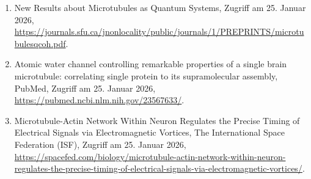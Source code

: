 \documentclass[11pt,a4paper]{article}
\begin{document}
\begin{enumerate}
\item New Results about Microtubules as Quantum Systems, Zugriff am 25. Januar 2026, \url{https://journals.sfu.ca/jnonlocality/public/journals/1/PREPRINTS/microtubulesqcoh.pdf}.
\item Atomic water channel controlling remarkable properties of a single brain microtubule: correlating single protein to its supramolecular assembly, PubMed, Zugriff am 25. Januar 2026, \url{https://pubmed.ncbi.nlm.nih.gov/23567633/}.
\item Microtubule-Actin Network Within Neuron Regulates the Precise Timing of Electrical Signals via Electromagnetic Vortices, The International Space Federation (ISF), Zugriff am 25. Januar 2026, \url{https://spacefed.com/biology/microtubule-actin-network-within-neuron-regulates-the-precise-timing-of-electrical-signals-via-electromagnetic-vortices/}.
\end{enumerate}
\end{document}
